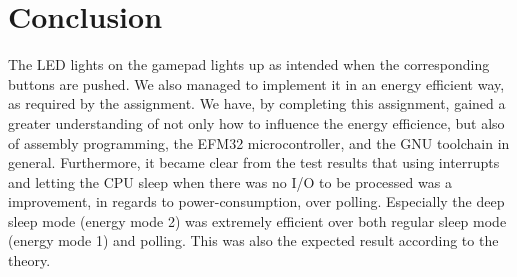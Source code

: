 \section{Conclusion}

The LED lights on the gamepad lights up as intended when the corresponding buttons are pushed. We also managed to implement it in an energy efficient way, as required by the assignment. We have, by completing this assignment, gained a greater understanding of not only how to influence the energy efficience, but also of assembly programming, the EFM32 microcontroller, and the GNU toolchain in general. Furthermore, it became clear from the test results that using interrupts and letting the CPU sleep when there was no I/O to be processed was a improvement, in regards to power-consumption, over polling. Especially the deep sleep mode (energy mode 2) was extremely efficient over both regular sleep mode (energy mode 1) and polling. This was also the expected result according to the theory.
